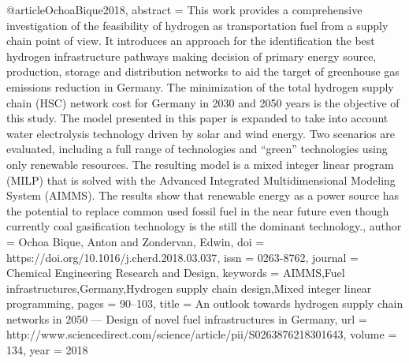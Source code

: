 @article{OchoaBique2018,
abstract = {This work provides a comprehensive investigation of the feasibility of hydrogen as transportation fuel from a supply chain point of view. It introduces an approach for the identification the best hydrogen infrastructure pathways making decision of primary energy source, production, storage and distribution networks to aid the target of greenhouse gas emissions reduction in Germany. The minimization of the total hydrogen supply chain (HSC) network cost for Germany in 2030 and 2050 years is the objective of this study. The model presented in this paper is expanded to take into account water electrolysis technology driven by solar and wind energy. Two scenarios are evaluated, including a full range of technologies and “green” technologies using only renewable resources. The resulting model is a mixed integer linear program (MILP) that is solved with the Advanced Integrated Multidimensional Modeling System (AIMMS). The results show that renewable energy as a power source has the potential to replace common used fossil fuel in the near future even though currently coal gasification technology is the still the dominant technology.},
author = {{Ochoa Bique}, Anton and Zondervan, Edwin},
doi = {https://doi.org/10.1016/j.cherd.2018.03.037},
issn = {0263-8762},
journal = {Chemical Engineering Research and Design},
keywords = {AIMMS,Fuel infrastructures,Germany,Hydrogen supply chain design,Mixed integer linear programming},
pages = {90--103},
title = {{An outlook towards hydrogen supply chain networks in 2050 — Design of novel fuel infrastructures in Germany}},
url = {http://www.sciencedirect.com/science/article/pii/S0263876218301643},
volume = {134},
year = {2018}
}
